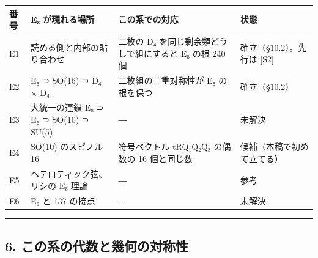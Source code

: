 \documentclass[
  a4paper,
]{ltjsarticle}
\newcounter{none} %
\begin{document}
{\def\LTcaptype{none} %
\begin{longtable}[]{@{}
  >{\raggedright\arraybackslash}p{}
  >{\raggedright\arraybackslash}p{}
  >{\raggedright\arraybackslash}p{}
  >{\raggedright\arraybackslash}p{}@{}}
\toprule\noalign{}
\begin{minipage}[b]{\linewidth}\raggedright
番号
\end{minipage} & \begin{minipage}[b]{\linewidth}\raggedright
E₈ が現れる場所
\end{minipage} & \begin{minipage}[b]{\linewidth}\raggedright
この系での対応
\end{minipage} & \begin{minipage}[b]{\linewidth}\raggedright
状態
\end{minipage} \\
\midrule\noalign{}
\endhead
\bottomrule\noalign{}
\endlastfoot
E1 & 読める側と内部の貼り合わせ & 二枚の D₄
を同じ剰余類どうしで組にすると E₈ の根 240 個 & 確立（§10.2）。先行は
{[}S2{]} \\
E2 & E₈ ⊃ SO(16) ⊃ D₄ × D₄ & 二枚組の三重対称性が E₈ の根を保つ &
確立（§10.2） \\
E3 & 大統一の連鎖 E₈ ⊃ E₆ ⊃ SO(10) ⊃ SU(5) & ― & 未解決 \\
E4 & SO(10) のスピノル 16 & 符号ベクトル tRQ₁Q₂Q₃ の偶数の 16 個と同じ数
& 候補（本稿で初めて立てる） \\
E5 & ヘテロティック弦、リシの E₈ 理論 & ― & 参考 \\
E6 & E₈ と 137 の接点 & ― & 未解決 \\
\end{longtable}
}

\begin{center}\rule{0.5\linewidth}{0.5pt}\end{center}

\subsection{6.
この系の代数と幾何の対称性}\label{ux3053ux306eux7cfbux306eux4ee3ux6570ux3068ux5e7eux4f55ux306eux5bfeux79f0ux6027}
\end{document}
